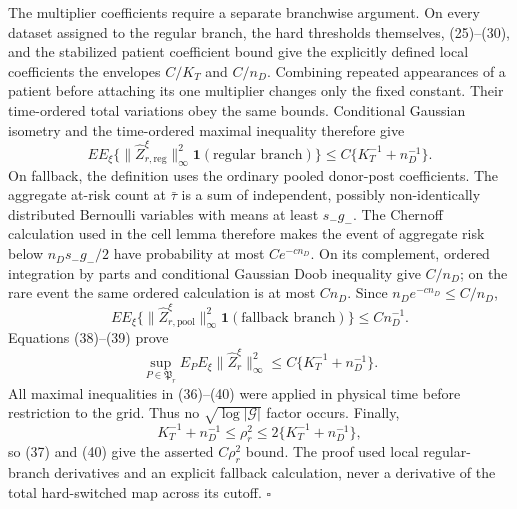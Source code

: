 The multiplier coefficients require a separate branchwise argument.  On
every dataset assigned to the regular branch, the hard thresholds themselves,
(25)--(30), and the stabilized patient coefficient bound give the explicitly
defined local coefficients the envelopes \(C/K_T\) and \(C/n_D\).  Combining
repeated appearances of a patient before attaching its one multiplier changes
only the fixed constant.  Their time-ordered total variations obey the same
bounds.  Conditional Gaussian isometry and the time-ordered maximal inequality
therefore give
\[
 E E_\xi\{\|\widehat Z_{r,\mathrm{reg}}^\xi\|_\infty^2
 \mathbf1(\text{regular branch})\}
 \leq C\{K_T^{-1}+n_D^{-1}\}.                          \tag{38}
\]
On fallback, the definition uses the ordinary pooled donor-post coefficients.
The aggregate at-risk count at \(\bar\tau\) is a sum of independent, possibly
non-identically distributed Bernoulli variables with means at least
\(s_-g_-\).  The Chernoff calculation used in the cell lemma therefore makes
the event of aggregate risk below \(n_Ds_-g_-/2\) have probability at most
\(Ce^{-cn_D}\).  On its complement, ordered integration by parts and
conditional Gaussian Doob inequality give \(C/n_D\); on the rare event the
same ordered calculation is at most \(Cn_D\).  Since
\(n_De^{-cn_D}\leq C/n_D\),
\[
 E E_\xi\{\|\widehat Z_{r,\mathrm{pool}}^\xi\|_\infty^2
 \mathbf1(\text{fallback branch})\}\leq Cn_D^{-1}.     \tag{39}
\]
Equations (38)--(39) prove
\[
 \sup_{P\in\mathfrak P_r}E_PE_\xi
 \|\widehat Z_r^\xi\|_\infty^2
 \leq C\{K_T^{-1}+n_D^{-1}\}.                         \tag{40}
\]
All maximal inequalities in (36)--(40) were applied in physical time before
restriction to the grid.  Thus no \(\sqrt{\log|\mathcal G|}\) factor occurs.
Finally,
\[
 K_T^{-1}+n_D^{-1}\leq\rho_r^2
 \leq2\{K_T^{-1}+n_D^{-1}\},
\]
so (37) and (40) give the asserted \(C\rho_r^2\) bound.  The proof used local
regular-branch derivatives and an explicit fallback calculation, never a
derivative of the total hard-switched map across its cutoff. \(\square\)